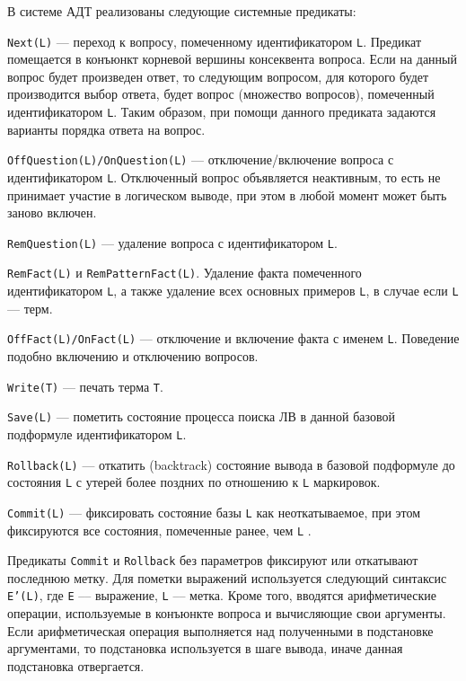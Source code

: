 В системе АДТ реализованы следующие системные предикаты:
\begin{description}

\item{\texttt{Next(L)}} --- переход к вопросу, помеченному идентификатором \texttt{L}. Предикат помещается в конъюнкт корневой вершины консеквента вопроса.  Если на данный вопрос будет произведен ответ, то следующим вопросом, для которого будет производится выбор ответа, будет вопрос (множество вопросов), помеченный идентификатором \texttt{L}. Таким образом, при помощи данного предиката задаются варианты порядка ответа на вопрос.

\item{\texttt{OffQuestion(L)/OnQuestion(L)}} --- отключение/включение вопроса с идентификатором \texttt{L}. Отключенный вопрос объявляется неактивным, то есть не принимает участие в логическом выводе, при этом в любой момент может быть заново включен.

\item{\texttt{RemQuestion(L)}} --- удаление вопроса с идентификатором \texttt{L}.

\item{\texttt{RemFact(L)} и \texttt{RemPatternFact(L)}}. Удаление факта помеченного идентификатором \texttt{L}, а также удаление всех основных примеров \texttt{L}, в случае если \texttt{L} --– терм.

\item{\texttt{OffFact(L)/OnFact(L)}} --- отключение и включение факта с именем \texttt{L}. Поведение подобно включению и отключению вопросов.

\item{\texttt{Write(T)}} --- печать терма \texttt{T}.

\item{\texttt{Save(L)}} --- пометить состояние процесса поиска ЛВ в данной базовой подформуле идентификатором \texttt{L}.

\item{\texttt{Rollback(L)}} --- откатить (backtrack) состояние вывода в базовой подформуле до состояния \texttt{L} с утерей более поздних по отношению к \texttt{L} маркировок.

\item{\texttt{Commit(L)}} --- фиксировать состояние базы \texttt{L} как неоткатываемое, при этом фиксируются все состояния, помеченные ранее, чем \texttt{L} .
\end{description}
Предикаты \texttt{Commit} и \texttt{Rollback} без параметров фиксируют или откатывают последнюю метку. Для пометки выражений используется следующий синтаксис \texttt{E'(L)}, где \texttt{E} --– выражение, \texttt{L} --– метка. Кроме того, вводятся арифметические операции, используемые в конъюнкте вопроса и вычисляющие свои аргументы. Если арифметическая операция выполняется над полученными в подстановке аргументами, то подстановка используется в шаге вывода, иначе данная подстановка отвергается.

